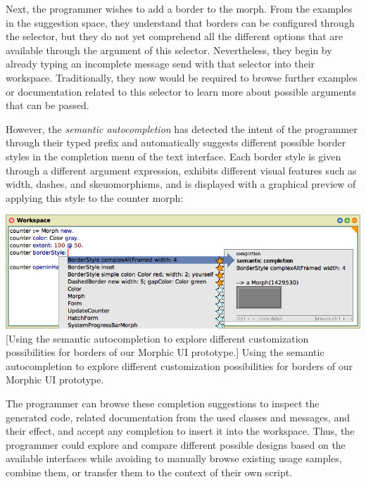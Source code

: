 Next, the programmer wishes to add a border to the morph.
From the examples in the suggestion space, they understand that borders can be configured through the  selector, but they do not yet comprehend all the different options that are available through the argument of this selector.
Nevertheless, they begin by already typing an incomplete message send with that selector into their workspace.
Traditionally, they now would be required to browse further examples or documentation related to this selector to learn more about possible arguments that can be passed.

However, the \emph{semantic autocompletion} has detected the intent of the programmer through their typed prefix and automatically suggests different possible border styles in the completion menu of the text interface.
Each border style is given through a different argument expression, exhibits different visual features such as width, dashes, and skeuomorphisms, and is displayed with a graphical preview of applying this style to the counter morph:

\begin{center}
	\includegraphics[width=\linewidth]{01_suggestions/semantic_autocompletion.png} %
	[Using the semantic autocompletion to explore different customization possibilities for borders of our Morphic UI prototype.]{
		Using the semantic autocompletion to explore different customization possibilities for borders of our Morphic UI prototype.
	}
\end{center}

The programmer can browse these completion suggestions to inspect the generated code, related documentation from the used classes and messages, and their effect, and accept any completion to insert it into the workspace.
Thus, the programmer could explore and compare different possible designs based on the available interfaces while avoiding to manually browse existing usage samples, combine them, or transfer them to the context of their own script.

